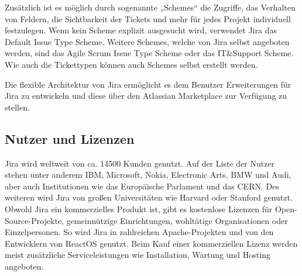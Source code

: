 Zus\"atzlich ist es m\"oglich durch sogenannte „Schemes“ die Zugriffe, das Verhalten von Feldern, die Sichtbarkeit der Tickets und mehr f\"ur jedes Projekt individuell festzulegen. Wenn kein Scheme explizit ausgesucht wird, verwendet Jira das Default Issue Type Scheme. Weitere Schemes, welche von Jira selbst angeboten werden, sind das Agile Scrum Issue Type Scheme oder das IT\&Support Scheme. Wie auch die Tickettypen k\"onnen auch Schemes selbst erstellt werden.

Die flexible Architektur von Jira erm\"oglicht es dem Benutzer Erweiterungen f\"ur Jira zu entwickeln und diese \"uber den Atlassian Marketplace zur Verf\"ugung zu stellen.

\subsection{Nutzer und Lizenzen}
Jira wird weltweit  von ca. 14500 Kunden genutzt. Auf der Liste der Nutzer stehen unter anderem IBM, Microsoft, Nokia, Electronic Arts, BMW und Audi, aber auch Institutionen wie das Europ\"aische Parlament und das CERN. Des weiteren wird Jira von großen Universit\"aten wie Harvard oder Stanford genutzt. Obwohl Jira ein kommerzielles Produkt ist, gibt es kostenlose Lizenzen f\"ur Open-Source-Projekte, gemeinn\"utzige Einrichtungen, wohlt\"atige Organisationen oder Einzelpersonen. So wird Jira in zahlreichen Apache-Projekten und von den Entwicklern von ReactOS genutzt. Beim Kauf einer kommerziellen Lizenz werden meist zus\"atzliche Serviceleistungen wie Installation, Wartung und Hosting angeboten.
